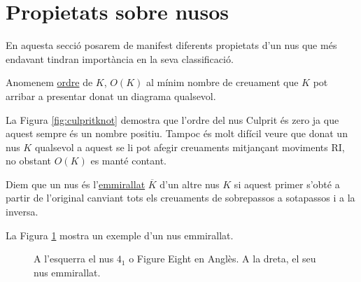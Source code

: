 
\section{Propietats sobre nusos}\label{sec:Propietats_sobre_nusos}

En aquesta secció posarem de manifest diferents propietats d'un nus que més endavant tindran importància en la seva classificació.

\begin{definition}\label{def:ordre}
	Anomenem \underline{ordre} de $K$, $O(K)$ al mínim nombre de creuament que $K$ pot arribar a presentar donat un diagrama qualsevol.
\end{definition}

La Figura \ref{fig:culpritknot} demostra que l'ordre del nus Culprit és zero ja que aquest sempre és un nombre positiu. Tampoc és molt difícil veure que donat un nus $K$ qualsevol a aquest se li pot afegir creuaments mitjançant moviments RI, no obstant $O(K)$ es manté contant.

\begin{definition}\label{def:nusemmirallat}
	Diem que un nus és l'\underline{emmirallat} $\overline{K}$ d'un altre nus $K$ si aquest primer s'obté a partir de l'original canviant tots els creuaments de sobrepassos a sotapassos i a la inversa.
\end{definition}

La Figura \ref{fig:nus emmirallat} mostra un exemple d'un nus emmirallat.\\

\begin{figure}
	\caption{A l'esquerra el nus $4_1$ o Figure Eight en Anglès. A la dreta, el seu nus emmirallat.}\label{fig:nus emmirallat}
\end{figure}

